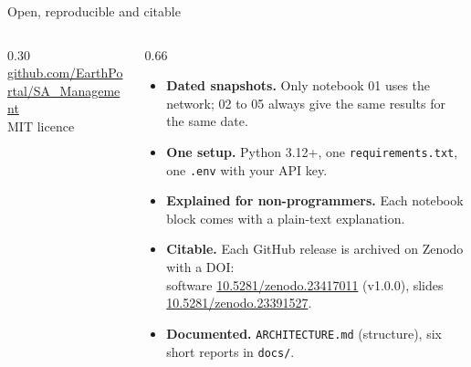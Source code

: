 \documentclass[aspectratio=169,10pt]{beamer}
\newcommand{\code}[1]{\texttt{\small #1}}
\begin{document}
\begin{frame}{Open, reproducible and citable}
  \begin{columns}[T]
    \begin{column}{0.30\textwidth}
      \centering
      \\[4pt]
      \scriptsize\href{https://github.com/EarthPortal/SA_Management}{github.com/EarthPortal/SA\_Management}\\[2pt]
      MIT licence
    \end{column}
    \begin{column}{0.66\textwidth}
      \small
      \begin{itemize}
        \item \textbf{Dated snapshots.} Only notebook 01 uses the network; 02 to 05 always give the same
              results for the same date.
        \item \textbf{One setup.} Python 3.12+, one \code{requirements.txt}, one \code{.env} with your
              API key.
        \item \textbf{Explained for non-programmers.} Each notebook block comes with a plain-text explanation.
        \item \textbf{Citable.} Each GitHub release is archived on Zenodo with a DOI:\\
              software \href{https://doi.org/10.5281/zenodo.23417011}{10.5281/zenodo.23417011} (v1.0.0),
              slides \href{https://doi.org/10.5281/zenodo.23391527}{10.5281/zenodo.23391527}.
        \item \textbf{Documented.} \code{ARCHITECTURE.md} (structure), six short reports in \code{docs/}.
      \end{itemize}
    \end{column}
  \end{columns}
\end{frame}
\end{document}
